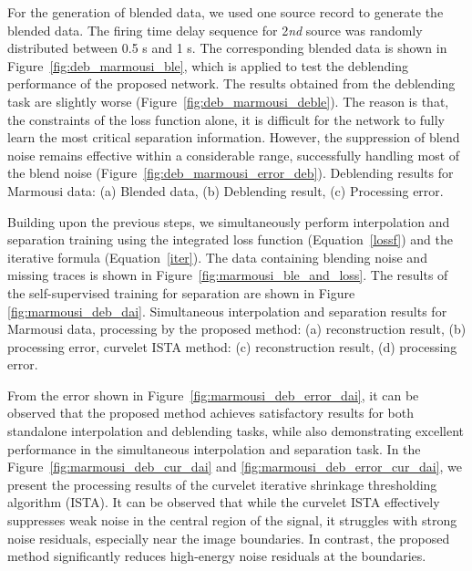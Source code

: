 \documentclass{segabs}
\begin{document}
For the generation of blended data, we used one source record to generate the blended data. The firing time delay sequence for 2\textit{nd} source was randomly distributed between 0.5 s and 1 s. The corresponding blended data is shown in Figure~\ref{fig:deb_marmousi_ble}, which is applied to test the deblending performance of the proposed network.
The results obtained from the deblending task are slightly worse (Figure~\ref{fig:deb_marmousi_deble}). The reason is that, the constraints of the loss function alone, it is difficult for the network to fully learn the most critical separation information. However, the suppression of blend noise remains effective within a considerable range, successfully handling most of the blend noise (Figure~\ref{fig:deb_marmousi_error_deb}).
{Deblending results for Marmousi data:
(a) Blended data,
(b) Deblending result,
(c) Processing error.}

Building upon the previous steps, we simultaneously perform interpolation and separation training using the integrated loss function (Equation~\ref{lossf}) and the iterative formula (Equation~\ref{iter}). The data containing blending noise and missing traces is shown in Figure~\ref{fig:marmousi_ble_and_loss}. The results of the self-supervised training for separation are shown in Figure \ref{fig:marmousi_deb_dai}.
{Simultaneous interpolation and separation results for Marmousi data, processing by the proposed method: (a) reconstruction result,
(b) processing error, curvelet ISTA method: (c) reconstruction result,
(d) processing error.}

From the error shown in Figure~\ref{fig:marmousi_deb_error_dai}, it can be observed that the proposed method achieves satisfactory results for both standalone interpolation and deblending tasks, while also demonstrating excellent performance in the simultaneous interpolation and separation task. In the Figure~\ref{fig:marmousi_deb_cur_dai} and \ref{fig:marmousi_deb_error_cur_dai}, we present the processing results of the curvelet iterative shrinkage thresholding algorithm (ISTA). It can be observed that while the curvelet ISTA effectively suppresses weak noise in the central region of the signal, it struggles with strong noise residuals, especially near the image boundaries. In contrast, the proposed method significantly reduces high-energy noise residuals at the boundaries.
\end{document}
